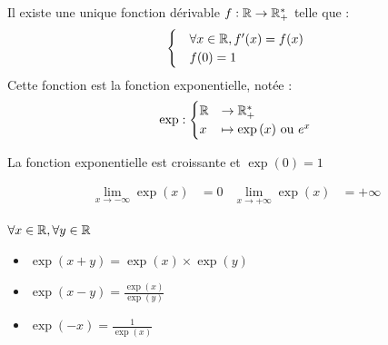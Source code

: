 \begin{graybox}
	\begin{theoreme}[]
		Il existe une unique fonction dérivable $f:\mathbb{R} \to \mathbb{R}_+^*$ telle que :
		\begin{align*}
			\begin{cases}
				&\forall x \in \mathbb{R}, f'(x) = f(x) \\
				&f(0) = 1
			\end{cases}
		\end{align*}
		Cette fonction est la fonction exponentielle, notée :
		\begin{align*}
			\exp :
			\begin{cases}
				\mathbb{R} &\to \mathbb{R}^*_+ \\
				x &\mapsto \exp{(x)} \text{ ou } e^x     
			\end{cases}
		\end{align*}
	\end{theoreme}
\end{graybox}

\begin{graybox}
	\begin{proposition}
		La fonction exponentielle est croissante et $\exp{(0)} = 1$
	\end{proposition}
\end{graybox}

\begin{graybox}
	\begin{proposition}
		\begin{align*}
			\lim_{x \to -\infty} \exp{(x)} &= 0 & \lim_{x \to +\infty} \exp{(x)} &= +\infty
		\end{align*}
	\end{proposition}
\end{graybox}

\begin{graybox}
	\begin{proposition}
		$\forall x \in \mathbb{R}, \forall y \in \mathbb{R}$
		\begin{itemize}
			\item $\exp{(x+y)} = \exp{(x)} \times \exp{(y)}$
			\item $\exp{(x - y)} = \frac{\exp{(x)}}{\exp{(y)}}$
			\item $\exp{(-x)} = \frac{1}{\exp{(x)}}$
		\end{itemize}    
	\end{proposition}
\end{graybox}


